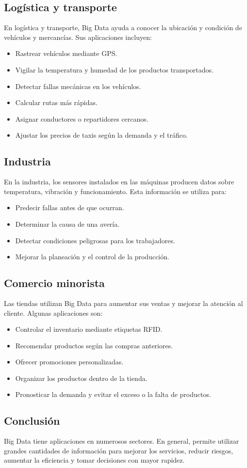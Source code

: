 \subsection{Logística y transporte}

En logística y transporte, Big Data ayuda a conocer la ubicación y condición de vehículos y mercancías. Sus aplicaciones incluyen:

\begin{itemize}
    \item Rastrear vehículos mediante GPS.
    \item Vigilar la temperatura y humedad de los productos transportados.
    \item Detectar fallas mecánicas en los vehículos.
    \item Calcular rutas más rápidas.
    \item Asignar conductores o repartidores cercanos.
    \item Ajustar los precios de taxis según la demanda y el tráfico.
\end{itemize}

\subsection{Industria}

En la industria, los sensores instalados en las máquinas producen datos sobre temperatura, vibración y funcionamiento. Esta información se utiliza para:

\begin{itemize}
    \item Predecir fallas antes de que ocurran.
    \item Determinar la causa de una avería.
    \item Detectar condiciones peligrosas para los trabajadores.
    \item Mejorar la planeación y el control de la producción.
\end{itemize}

\subsection{Comercio minorista}

Las tiendas utilizan Big Data para aumentar sus ventas y mejorar la atención al cliente. Algunas aplicaciones son:

\begin{itemize}
    \item Controlar el inventario mediante etiquetas RFID.
    \item Recomendar productos según las compras anteriores.
    \item Ofrecer promociones personalizadas.
    \item Organizar los productos dentro de la tienda.
    \item Pronosticar la demanda y evitar el exceso o la falta de productos.
\end{itemize}

\subsection{Conclusión}

Big Data tiene aplicaciones en numerosos sectores. En general, permite utilizar grandes cantidades de información para mejorar los servicios, reducir riesgos, aumentar la eficiencia y tomar decisiones con mayor rapidez.